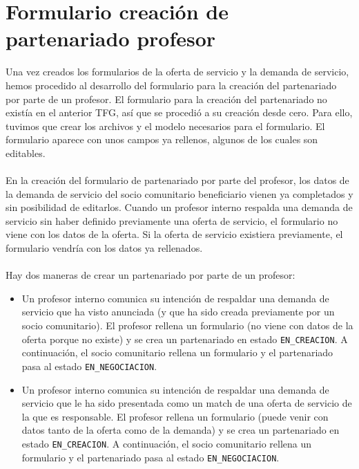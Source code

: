 \documentclass[11pt]{book}
\begin{document}
 \section{Formulario creación de partenariado profesor}
 Una vez creados los formularios de la oferta de servicio y la demanda de servicio, hemos procedido al desarrollo del formulario para la creación del partenariado por parte de un profesor.
 El formulario para la creación del partenariado no existía en el anterior TFG, así que se procedió a su creación desde cero. Para ello, tuvimos que crear los archivos y el modelo necesarios para el formulario. El formulario aparece con unos campos ya rellenos, algunos de los cuales son editables.\\\\
 En la creación del formulario de partenariado por parte del profesor, los datos de la demanda de servicio del socio comunitario beneficiario vienen ya completados y sin posibilidad de editarlos. Cuando un profesor interno respalda una demanda de servicio sin haber definido previamente una oferta de servicio, el formulario no viene con los datos de la oferta. Si la oferta de servicio existiera previamente, el formulario vendría con los datos ya rellenados.\\\\ 
 Hay dos maneras de crear un partenariado por parte de un profesor:
 \begin{itemize}
 	\item Un profesor interno comunica su intención de respaldar una
 	demanda de servicio que ha visto anunciada (y que ha sido creada
 	previamente por un socio comunitario).
 	El profesor rellena un formulario (no viene con datos de la oferta
 	porque no existe) y se crea un partenariado en estado \texttt{EN\_CREACION}.
 	A continuación, el socio comunitario rellena un formulario y el
 	partenariado pasa al estado \texttt{EN\_NEGOCIACION}.
 	\item Un profesor interno comunica su intención de respaldar una
 	demanda de servicio que le ha sido presentada como un match de una
 	oferta de servicio de la que es responsable. El profesor rellena un formulario (puede venir con datos tanto de la oferta como de la demanda) y se crea un partenariado en estado \texttt{EN\_CREACION}. A continuación, el socio comunitario rellena un formulario y el partenariado pasa al estado \texttt{EN\_NEGOCIACION}.\\\\
 	
 \end{itemize}
\end{document}
